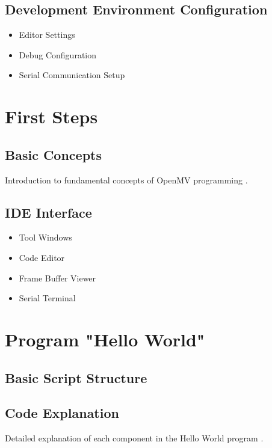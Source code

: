 \subsection{Development Environment Configuration}

\begin{itemize}
    
    \item Editor Settings
    
    \item Debug Configuration
    
    \item Serial Communication Setup
    
\end{itemize}



\section{First Steps}

\subsection{Basic Concepts}

Introduction to fundamental concepts of OpenMV programming \cite{openmv:2024}.



\subsection{IDE Interface}

\begin{itemize}
    
    \item Tool Windows
    
    \item Code Editor
    
    \item Frame Buffer Viewer
    
    \item Serial Terminal
    
\end{itemize}



\section{Program "Hello World"}

\subsection{Basic Script Structure}


{
    \label{OpenMV:example}
}



\subsection{Code Explanation}

Detailed explanation of each component in the Hello World program \cite{openmvgithub:2024,openmv:2024}.



